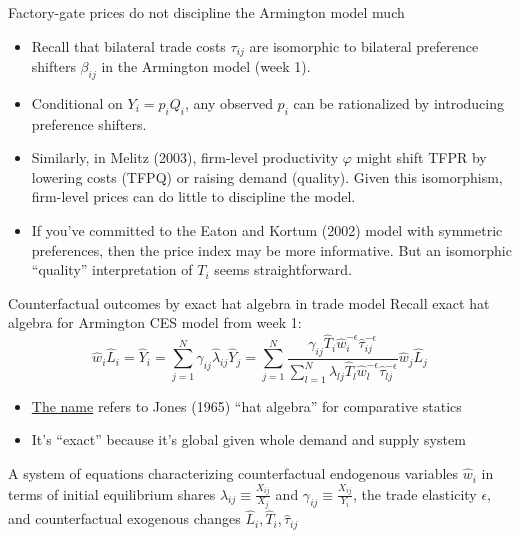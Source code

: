 \documentclass[11pt,notes=hide,aspectratio=169]{beamer}
\begin{document}
\begin{frame}{Factory-gate prices do not discipline the Armington model much}
\begin{itemize}
\item
Recall that bilateral trade costs $\tau_{ij}$ are isomorphic to bilateral preference shifters $\beta_{ij}$ in the Armington model (week 1).
\item
Conditional on $Y_i = p_i Q_i$, any observed $p_i$ can be rationalized by introducing preference shifters.
\item
Similarly, in Melitz (2003), firm-level productivity $\varphi$ might shift TFPR by lowering costs (TFPQ) or raising demand (quality).
Given this isomorphism, firm-level prices can do little to discipline the model.
\item
If you've committed to the Eaton and Kortum (2002) model with symmetric preferences,
then the price index may be more informative.
But an isomorphic ``quality'' interpretation of $T_i$ seems straightforward.
\end{itemize}
\end{frame}
\begin{frame}{Counterfactual outcomes by exact hat algebra in trade model}
Recall exact hat algebra for Armington CES model from week 1:
\begin{equation*}
\hat{w}_i \hat{L}_i
=
\hat{Y}_{i}
=
\sum_{j=1}^{N} \gamma_{ij} \hat{\lambda}_{ij} \hat{Y}_{j}
= 
\sum_{j=1}^{N}
\frac{\gamma_{ij} \hat{T}_{i} \hat{w}_{i}^{-\epsilon}\hat{\tau}_{ij}^{-\epsilon}}
{\sum_{l=1}^{N} \lambda_{lj} \hat{T}_{l} \hat{w}_l^{-\epsilon}\hat{\tau}_{lj}^{-\epsilon}}
\hat{w}_{j} \hat{L}_{j}
\end{equation*}
\vspace{-3mm}
\begin{itemize}
\item \href{https://tradediversion.net/2018/05/07/on-hat-algebra/}{The name} refers to Jones (1965) ``hat algebra'' for comparative statics
\item It's ``exact'' because it's global given whole demand and supply system
\end{itemize}
\vspace{3mm}
A system of equations characterizing counterfactual endogenous variables $\hat{w}_i$
in terms of 
initial equilibrium shares $\lambda_{ij} \equiv \frac{X_{ij}}{X_j}$ and $\gamma_{ij} \equiv \frac{X_{ij}}{Y_i}$,
the trade elasticity $\epsilon$,
and
counterfactual exogenous changes $\hat{L}_{i}, \hat{T}_i, \hat{\tau}_{ij}$
\end{frame}
\end{document}
